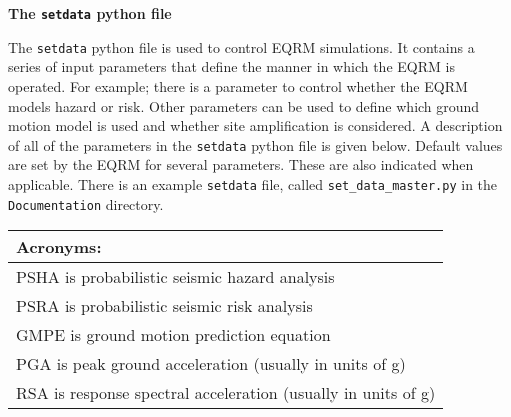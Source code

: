 \documentclass[a4paper, 12pt]{report}
\begin{document}
\newcommand{\indexfunc}[1]{\index{#1@\texttt{#1}}\index{function!#1@\texttt{#1}}}
\newcommand{\typepar}[3]{\linebreak[2]\texttt{#1}\-\texttt{#2}\-\texttt{#3}}
\newcommand{\typeself}[3]{\linebreak[2]\texttt{#1}\-\texttt{#2}\-\texttt{#3}\index{#1#2#3@\texttt{#1#2#3}}}
\newcommand{\indexpar}[1]{\index{#1@\texttt{#1}}\index{setdata parameter@ \texttt{setdata} parameter!#1@\texttt{#1}}}
\newcommand{\typefunc}[3]{\linebreak[2]\texttt{#1}\-\texttt{#2}\-\texttt{#3}\indexfunc{#1#2#3}}

\newcommand{\manual}[1]{Manual: #1}

\LARGE \noindent \textbf{The \texttt{setdata} python file}

\vspace{1em}
\normalsize The \texttt{setdata} python file is used to
control EQRM simulations. It contains a series of input parameters
that define the manner in which the EQRM is operated. For example;
there is a parameter to control whether the EQRM models hazard or
risk. Other parameters can be used to define which ground motion
model is used and whether site amplification is considered. A
description of all of the parameters in the
 \texttt{setdata} python file is given below. Default values are set by the
EQRM for several parameters. These are also indicated when
applicable.
 There is an example
\texttt{setdata} file, called \texttt{set\_data\_master.py}
in the \texttt{Documentation} directory.

\vspace{2em}

\begin{tabular}{l}
\hline
\textbf{Acronyms}: \\
\hline
PSHA is probabilistic seismic hazard analysis \\
PSRA is probabilistic seismic risk analysis  \\
GMPE is ground motion prediction equation \\
PGA is peak ground acceleration (usually in units of g) \\
RSA is response spectral acceleration (usually in units of g) \\
\hline
\end{tabular}
\end{document}
